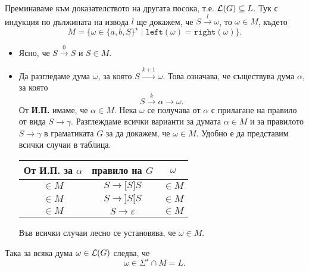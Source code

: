\begin{hint}
  Преминаваме към доказателството на другата посока, т.е. $\mathcal{L}(G) \subseteq L$.
  Тук с индукция по дължината на извода $l$ ще докажем, че
  $S \stackrel{l}{\to} \omega$, то $\omega \in M$,
  където
  \[M = \{\omega \in \{a,b,S\}^\star \mid \texttt{left}(\omega) = \texttt{right}(\omega)\}.\]
  \begin{itemize}
  \item 
    Ясно, че $S \stackrel{0}{\rightarrow} S$ и $S \in M$.
  \item
    Да разгледаме дума $\omega$, за която $S \stackrel{k+1}{\to} \omega$.
    Това означава, че съществува дума $\alpha$, за която
    \[S \stackrel{k}{\to} \alpha \to \omega.\]
    От {\bf И.П.} имаме, че $\alpha \in M$.
    Нека $\omega$ се получава от $\alpha$ с прилагане на правило от вида $S \to \gamma$.
    Разглеждаме всички варианти за думата $\alpha \in M$ и за правилото $S \to \gamma$ в граматиката $G$
    за да докажем, че $\omega \in M$.
    Удобно е да представим всички случаи в таблица.
    \begin{center}
      \begin{tabular}{| c | c | c |}
        \hline
        От И.П. за $\alpha$ & правило на $G$ & $\omega$ \\ \hline
        $\in M$ & $S \to \texttt{[}S\texttt{]}S$ & $\in M$ \\ \hline
        $\in M$ & $S \to \texttt{]}S\texttt{[}S$ & $\in M$ \\ \hline
        $\in M$ & $S \to \varepsilon$ & $\in M$ \\ \hline
      \end{tabular}
    \end{center}    
    Във всички случаи лесно се установява, че $\omega \in M$.
  \end{itemize}
  Така за всяка дума $\omega \in \mathcal{L}(G)$ следва, че
  \[\omega \in \Sigma^\star \cap M = L.\]
\end{hint}

